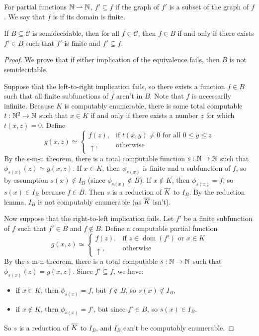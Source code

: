 \begin{definition}
  For partial functions $\mathbb{N} \rightharpoonup \mathbb{N}$, $f' \subseteq f$ if the graph
  of $f'$ is a subset of the graph of $f$.
  We say that $f$ is  if its domain is finite.
\end{definition}

\begin{theorem}
  If $B \subseteq \mathcal{C}$ is semidecidable, then for all $f \in
  \mathcal{C}$, then $f \in B$ if and only if there exists $f' \in B$ such that
  $f'$ is finite and $f' \subseteq f$.
\end{theorem}

\begin{proof}
  We prove that if either implication of the equivalence fails, then $B$ is not
  semidecidable.

  Suppose that the left-to-right implication fails, so there exists a function
  $f \in B$ such that all finite subfunctions of $f$ aren't in $B$.
  Note that $f$ is necessarily infinite.
  Because $K$ is computably enumerable, there is some total computable $t: \mathbb{N}^2
  \to \mathbb{N}$ such that $x \in K$ if and only if there exists a number $z$ for which
  $t(x,z) = 0$.
  Define
  \[
	g(x,z) \simeq
	\begin{cases}
	  f(z), & \text{if $t(x,y) \ne 0$ for all $0 \le y \le z$} \\
	  \uparrow, & \text{otherwise}
	\end{cases}
  \]
  By the s-m-n theorem, there is a total computable function $s: \mathbb{N} \to \mathbb{N}$ such
  that $\phi_{s(x)}(z) \simeq g(x,z)$.
  If $x \in K$, then $\phi_{s(x)}$ is finite and a subfunction of $f$, so by
  assumption $s(x) \notin I_B$ (since $\phi_{s(x)} \notin B$).
  If $x \notin K$, then $\phi_{s(x)} = f$, so $s(x) \in I_B$ because $f \in B$.
  Then $s$ is a reduction of $\overline{K}$ to $I_B$.
  By the reduction lemma, $I_B$ is not computably enumerable (as $\overline{K}$
  isn't).

  Now suppose that the right-to-left implication fails.
  Let $f'$ be a finite subfunction of $f$ such that $f' \in B$ and $f \notin B$.
  Define a computable partial function
  \[
	g(x,z) \simeq
	\begin{cases}
	  f(z), & \text{if $z \in \operatorname{dom}(f')$ or $x \in K$} \\
	  \uparrow, & \text{otherwise}
	\end{cases}
  \]
  By the s-m-n theorem, there is a total computable $s: \mathbb{N} \to \mathbb{N}$ such that
  $\phi_{s(x)}(z) = g(x,z)$.
  Since $f' \subseteq f$, we have:
  \begin{itemize}
  \item if $x \in K$, then $\phi_{s(x)} = f$, but $f \notin B$, so $s(x) \notin
	I_B$,
  \item if $x \notin K$, then $\phi_{s(x)} = f'$, but since $f' \in B$, so $s(x)
	\in I_B$.
  \end{itemize}
  So $s$ is a reduction of $\overline{K}$ to $I_B$, and $I_B$ can't be computably
  enumerable.
\end{proof}

